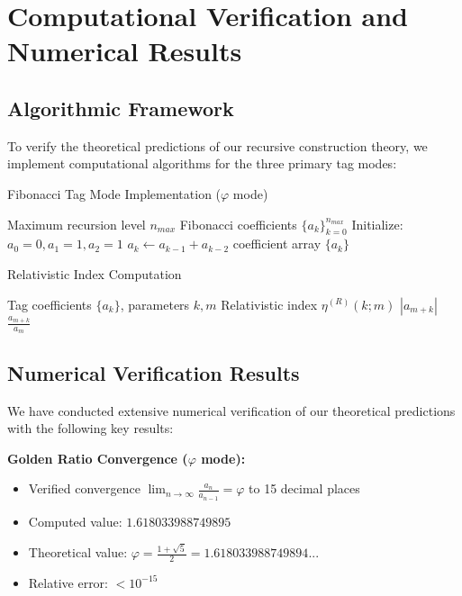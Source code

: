 \documentclass[12pt]{article}
\theoremstyle{plain}
\theoremstyle{definition}
\begin{document}
\section{Computational Verification and Numerical Results}

\subsection{Algorithmic Framework}

To verify the theoretical predictions of our recursive construction theory, we implement computational algorithms for the three primary tag modes:

\begin{algorithm}
\caption{Fibonacci Tag Mode Implementation ($\varphi$ mode)}
\begin{algorithmic}[1]
\Require Maximum recursion level $n_{max}$
\Ensure Fibonacci coefficients $\{a_k\}_{k=0}^{n_{max}}$
\State Initialize: $a_0 = 0, a_1 = 1, a_2 = 1$
    \State $a_k \leftarrow a_{k-1} + a_{k-2}$
\EndFor
\State \Return coefficient array $\{a_k\}$
\end{algorithmic}
\end{algorithm}

\begin{algorithm}
\caption{Relativistic Index Computation}
\begin{algorithmic}[1]
\Require Tag coefficients $\{a_k\}$, parameters $k, m$
\Ensure Relativistic index $\eta^{(R)}(k; m)$
    \State \Return $|a_{m+k}|$ 
\Else
    \State \Return $\frac{a_{m+k}}{a_m}$
\EndIf
\end{algorithmic}
\end{algorithm}

\subsection{Numerical Verification Results}

We have conducted extensive numerical verification of our theoretical predictions with the following key results:

\textbf{Golden Ratio Convergence ($\varphi$ mode):}
\begin{itemize}
\item Verified convergence $\lim_{n \to \infty} \frac{a_n}{a_{n-1}} = \varphi$ to 15 decimal places
\item Computed value: $1.618033988749895$
\item Theoretical value: $\varphi = \frac{1+\sqrt{5}}{2} = 1.618033988749894...$
\item Relative error: $< 10^{-15}$
\end{itemize}
\end{document}
